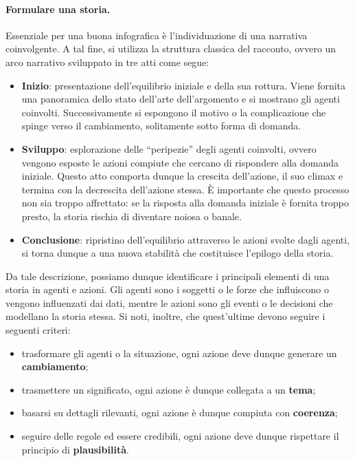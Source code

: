 \paragraph{Formulare una storia.}
Essenziale per una buona infografica è l'individuazione di una narrativa coinvolgente.
A tal fine, si utilizza la struttura classica del racconto, ovvero un arco narrativo sviluppato in tre atti come segue:
\begin{itemize}
    \item \textbf{Inizio}: presentazione dell'equilibrio iniziale e della sua rottura. Viene fornita una panoramica dello stato dell'arte dell'argomento e si mostrano gli agenti coinvolti. 
    Successivamente si espongono il motivo o la complicazione che spinge verso il cambiamento, solitamente sotto forma di domanda.
    \item \textbf{Sviluppo}: esplorazione delle ``peripezie'' degli agenti coinvolti, ovvero vengono esposte le azioni compiute che cercano di rispondere alla domanda iniziale.
    Questo atto comporta dunque la crescita dell'azione, il suo climax e termina con la decrescita dell'azione stessa. È importante che questo processo non sia troppo affrettato: 
    se la risposta alla domanda iniziale è fornita troppo presto, la storia rischia di diventare noiosa o banale.
    \item \textbf{Conclusione}: ripristino dell'equilibrio attraverso le azioni svolte dagli agenti, si torna dunque a una nuova stabilità che costituisce l'epilogo della storia.
\end{itemize} 

\bigskip
\noindent Da tale descrizione, possiamo dunque identificare i principali elementi di una storia in agenti e azioni. Gli agenti sono i soggetti o le forze che influiscono o vengono influenzati dai dati, mentre 
le azioni sono gli eventi o le decisioni che modellano la storia stessa. Si noti, inoltre, che quest'ultime devono seguire i seguenti criteri:
\begin{itemize}
    \item trasformare gli agenti o la situazione, ogni azione deve dunque generare un \textbf{cambiamento};
    \item trasmettere un significato, ogni azione è dunque collegata a un \textbf{tema};
    \item basarsi su dettagli rilevanti, ogni azione è dunque compiuta con \textbf{coerenza};
    \item seguire delle regole ed essere credibili, ogni azione deve dunque rispettare il principio di \textbf{plausibilità}.
\end{itemize}

